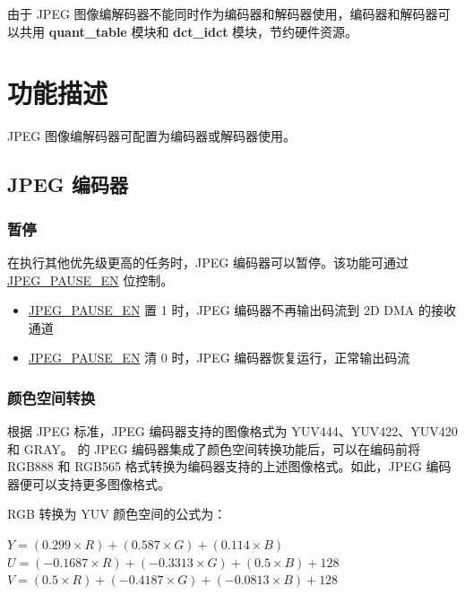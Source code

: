 \documentclass[main\_\_CN.tex]{subfiles}
\begin{document}
由于 JPEG 图像编解码器不能同时作为编码器和解码器使用，编码器和解码器可以共用 \textbf{quant\_table} 模块和 \textbf{dct\_idct} 模块，节约硬件资源。


\section{功能描述}
\label{sec:jpegcodec-func-descr}

JPEG 图像编解码器可配置为编码器或解码器使用。

\subsection{JPEG 编码器}
\label{sec:jpegcodec-enc-mode}


\subsubsection{暂停}
\label{sec:jpegcodec-enc-pause}

在执行其他优先级更高的任务时，JPEG 编码器可以暂停。该功能可通过 \hyperref[fielddesc:JPEGPAUSEEN]{JPEG\_PAUSE\_EN} 位控制。

\begin{itemize}
    \item \hyperref[fielddesc:JPEGPAUSEEN]{JPEG\_PAUSE\_EN} 置 1 时，JPEG 编码器不再输出码流到 2D DMA 的接收通道
    \item \hyperref[fielddesc:JPEGPAUSEEN]{JPEG\_PAUSE\_EN} 清 0 时，JPEG 编码器恢复运行，正常输出码流
\end{itemize}

\subsubsection{颜色空间转换}
\label{sec:jpegcodec-enc-csc}

根据 JPEG 标准，JPEG 编码器支持的图像格式为 YUV444、YUV422、YUV420 和 GRAY。\chipname{} 的 JPEG 编码器集成了颜色空间转换功能后，可以在编码前将 RGB888 和 RGB565 格式转换为编码器支持的上述图像格式。如此，JPEG 编码器便可以支持更多图像格式。

RGB 转换为 YUV 颜色空间的公式为：
\begin{center}
$Y = (0.299 \times R) + (0.587 \times G) + (0.114 \times B)$ \\
$U = (-0.1687 \times R) + (-0.3313 \times G) + (0.5 \times B) + 128$ \\
$V = (0.5 \times R) + (-0.4187 \times G) + (-0.0813 \times B) + 128$ \\
\end{center}
\end{document}
